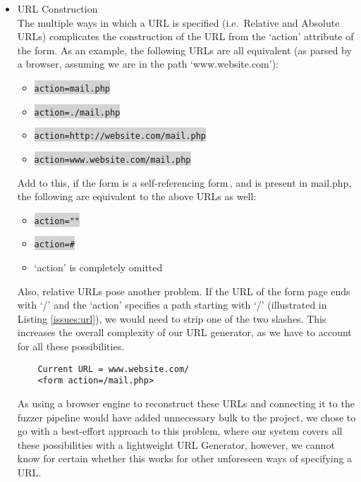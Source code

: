 \begin{itemize}
	\item URL Construction\\
	The multiple ways in which a URL is specified (i.e.\ Relative and Absolute URLs) complicates the construction of the URL from the `action' attribute of the form.  As an example, the following URLs are all equivalent (as parsed by a browser, assuming we are in the path `www.website.com'):
	
	\begin{itemize}
		\item \colorbox{lightgray}{\lstinline{action=mail.php}}
		\item \colorbox{lightgray}{\lstinline{action=./mail.php}}
		\item \colorbox{lightgray}{\lstinline{action=http://website.com/mail.php}}
		\item \colorbox{lightgray}{\lstinline{action=www.website.com/mail.php}}
	\end{itemize}
	Add to this, if the form is a self-referencing form\,\footnotemark, and is present in mail.php, the following are equivalent to the above URLs as well:
	\begin{itemize}
		\item \colorbox{lightgray}{\lstinline{action=""}}
		\item \colorbox{lightgray}{\lstinline{action=#}}
		\item `action' is completely omitted
	\end{itemize}
	Also, relative URLs pose another problem. If the URL of the form page ends with `/' and the `action' specifies a path starting with `/' (illustrated in Listing \ref{issues:url}), we would need to strip one of the two slashes. This increases the overall complexity of our URL generator, as we have to account for all these possibilities.
		
	\begin{lstlisting}
	Current URL = www.website.com/
	<form action=/mail.php>
	\end{lstlisting}
	
	As using a browser engine to reconstruct these URLs  and connecting it to the fuzzer pipeline would have added unnecessary bulk to the project, we chose to go with a best-effort approach to this problem, where our system covers all these possibilities with a lightweight URL Generator, however, we cannot know for certain whether this works for other unforeseen ways of specifying a URL.
	

\end{itemize}
